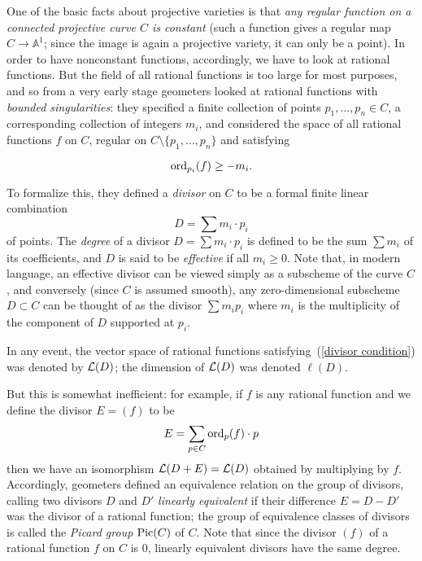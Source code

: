 \documentclass[12pt, leqno]{book}
\def\AA{{\mathbb A}}
\def\cL{{\cal L}}
\begin{document}
One of the basic facts about projective varieties is that \emph{any regular function on a connected projective curve $C$ is constant} (such a function gives a regular map $C \to \AA^1$; since the image is again a projective variety, it can only be a point).  In order to have nonconstant functions, accordingly, we have to look at rational functions. But the field of all rational functions is too large for most purposes, and so from a very early stage geometers looked at rational functions with \emph{bounded singularities}: they specified a finite collection of points $p_1,\dots,p_n \in C$, a corresponding collection of integers $m_i$, and considered the space of all rational functions $f$ on $C$, regular on $C \setminus \{p_1,\dots,p_n\}$  and satisfying

\begin{equation}\label{divisor condition}
\ord_{p_i}(f) \geq -m_i.
\end{equation}

To formalize this, they defined a \emph{divisor} on $C$ to be a formal finite linear combination
$$
D = \sum m_i \cdot p_i
$$
of points. The \emph{degree} of a divisor $D = \sum m_i \cdot p_i$ is defined to be the sum $\sum m_i$ of its coefficients, and $D$ is said to be \emph{effective} if all $m_i \geq 0$. Note that, in modern language, an effective divisor can be viewed simply as a subscheme of the curve $C$, and conversely (since $C$ is assumed smooth), any zero-dimensional subscheme $D \subset C$ can be thought of as the divisor $\sum m_ip_i$ where $m_i$ is the multiplicity of the component of $D$ supported at $p_i$.

In any event, the vector space of rational functions satisfying~(\ref{divisor condition}) was denoted by $\cL(D)$; the dimension of $\cL(D)$ was denoted $\ell(D)$.


But this is somewhat inefficient: for example, if $f$ is any rational function and we define the divisor $E = (f)$ to be
$$
E = \sum_{p\in C} \ord_p(f)\cdot p
$$
then we have an isomorphism $\cL(D+E) = \cL(D)$ obtained by multiplying by $f$. Accordingly, geometers defined an equivalence relation on the group of divisors, calling two divisors $D$ and $D'$ \emph{linearly equivalent} if their difference $E = D - D'$ was the divisor of a rational function; the group of equivalence classes of divisors is called the \emph{Picard group} $\Pic(C)$ of $C$. Note that since the divisor $(f)$ of a rational function $f$ on $C$ is 0, linearly equivalent divisors have the same degree.
\end{document}

